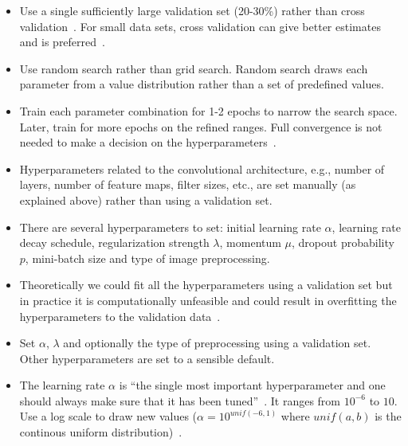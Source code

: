 \begin{itemize}

	\item Use a single sufficiently large validation set (20-30\%) rather than cross validation~\cite{Bengio2014}. For small data sets, cross validation can give better estimates and is preferred~\cite{Ng2014}.

	\item Use random search rather than grid search. Random search draws each parameter from a value distribution rather than a set of predefined values.~\cite{Bergstra2012}

	\item Train each parameter combination for 1-2 epochs to narrow the search space. Later, train for more epochs on the refined ranges. Full convergence is not needed to make a decision on the hyperparameters~\cite{Karpathy2015}.


	\item Hyperparameters related to the convolutional architecture, e.g., number of layers, number of feature maps, filter sizes, etc., are set manually (as explained above) rather than using a validation set.

	\item There are several hyperparameters to set: initial learning rate $\alpha$, learning rate decay schedule, regularization strength $\lambda$, momentum $\mu$, dropout probability $p$, mini-batch size and type of image preprocessing.

	\item Theoretically we could fit all the hyperparameters using a validation set but in practice it is computationally unfeasible and could result in overfitting the hyperparameters to the validation data~\cite{Cawley2010}.

	\item Set $\alpha$, $\lambda$ and optionally the type of preprocessing using a validation set. Other hyperparameters are set to a sensible default.


	\item The learning rate $\alpha$ is ``the single most important hyperparameter and one should always make sure that it has been tuned''~\cite{Bengio2012}. It ranges from $10^{-6}$ to $10$. Use a log scale to draw new values ($\alpha = 10^{unif(-6, 1)}$ where $unif(a,b)$ is the continous uniform distribution)~\cite{Karpathy2015}.


\end{itemize}
